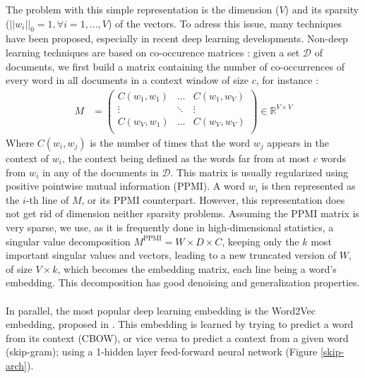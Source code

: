 \documentclass{article}
\newcommand{\R}{\mathbb R}
\begin{document}
The problem with this simple representation is the dimension ($V$)
and its sparsity ($||w_i||_0 = 1, \forall i= 1, ..., V$) of the vectors.
To adress this issue, many techniques have been proposed, especially 
in recent deep learning developments. Non-deep learning techniques 
are based on co-occurence matrices : 
given a set $\mathcal{D}$ of
documents, we first build a matrix containing the number of co-occurrences
of every word in all documents in a context window of size $c$, 
for instance :
\begin{align*}
    M&=
    \left (
    \begin{array}{ccc}
        C(w_1, w_1) & \dots & C(w_1, w_V) \\
            \vdots    & \ddots&   \vdots       \\
        C(w_V, w_1) & \dots & C(w_V, w_V) \\
    \end{array}
    \right ) \in \R^{V\times V}
\end{align*} 
Where $C(w_i, w_j)$ is the number of times that the word $w_j$ appears 
in the context of $w_i$, the context being defined as the 
words far from at most $c$ words from $w_i$ in any of the documents
in $\mathcal{D}$. This matrix is usually regularized using 
positive pointwise mutual information (PPMI). A word $w_i$
is then represented as the $i$-th line of $M$, or its
PPMI counterpart. However, this representation does not get rid
of dimension neither sparsity problems. Assuming the PPMI
matrix is very sparse, we use, as it is frequently
done in high-dimensional statistics,
a singular value decomposition $M^{\text{PPMI}} = W \times D \times C$, 
keeping only the $k$
most important singular values and vectors, leading to a new truncated
version of $W$, of size $V\times k$, which becomes the embedding
matrix, each line being a word's embedding. This decomposition
has good denoising and generalization properties. \\ \\
In parallel, the most popular deep learning embedding
is the Word2Vec embedding, proposed in \cite{NIPS2013_5021}. This 
embedding is learned by trying to predict a word from its context 
(CBOW), or vice versa to predict a context from a given word 
(skip-gram); using a 1-hidden layer feed-forward neural network
(Figure \ref{skip-arch}). 
\end{document}
